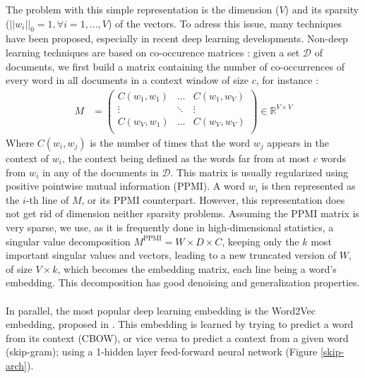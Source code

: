 \documentclass{article}
\newcommand{\R}{\mathbb R}
\begin{document}
The problem with this simple representation is the dimension ($V$)
and its sparsity ($||w_i||_0 = 1, \forall i= 1, ..., V$) of the vectors.
To adress this issue, many techniques have been proposed, especially 
in recent deep learning developments. Non-deep learning techniques 
are based on co-occurence matrices : 
given a set $\mathcal{D}$ of
documents, we first build a matrix containing the number of co-occurrences
of every word in all documents in a context window of size $c$, 
for instance :
\begin{align*}
    M&=
    \left (
    \begin{array}{ccc}
        C(w_1, w_1) & \dots & C(w_1, w_V) \\
            \vdots    & \ddots&   \vdots       \\
        C(w_V, w_1) & \dots & C(w_V, w_V) \\
    \end{array}
    \right ) \in \R^{V\times V}
\end{align*} 
Where $C(w_i, w_j)$ is the number of times that the word $w_j$ appears 
in the context of $w_i$, the context being defined as the 
words far from at most $c$ words from $w_i$ in any of the documents
in $\mathcal{D}$. This matrix is usually regularized using 
positive pointwise mutual information (PPMI). A word $w_i$
is then represented as the $i$-th line of $M$, or its
PPMI counterpart. However, this representation does not get rid
of dimension neither sparsity problems. Assuming the PPMI
matrix is very sparse, we use, as it is frequently
done in high-dimensional statistics,
a singular value decomposition $M^{\text{PPMI}} = W \times D \times C$, 
keeping only the $k$
most important singular values and vectors, leading to a new truncated
version of $W$, of size $V\times k$, which becomes the embedding
matrix, each line being a word's embedding. This decomposition
has good denoising and generalization properties. \\ \\
In parallel, the most popular deep learning embedding
is the Word2Vec embedding, proposed in \cite{NIPS2013_5021}. This 
embedding is learned by trying to predict a word from its context 
(CBOW), or vice versa to predict a context from a given word 
(skip-gram); using a 1-hidden layer feed-forward neural network
(Figure \ref{skip-arch}). 
\end{document}
